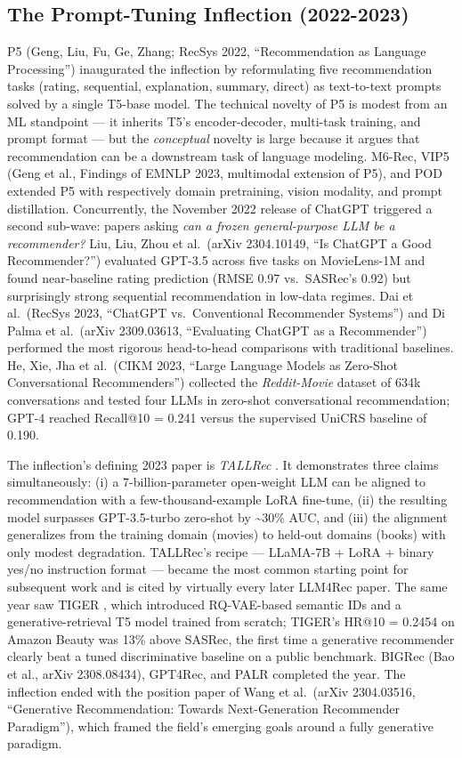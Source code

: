 \documentclass{article}
\begin{document}
\subsection{The Prompt-Tuning Inflection (2022-2023)}\label{the-prompt-tuning-inflection-2022-2023}

P5 (Geng, Liu, Fu, Ge, Zhang; RecSys 2022, ``Recommendation as Language Processing'') inaugurated the inflection by reformulating five recommendation tasks (rating, sequential, explanation, summary, direct) as text-to-text prompts solved by a single T5-base model. The technical novelty of P5 is modest from an ML standpoint --- it inherits T5's encoder-decoder, multi-task training, and prompt format --- but the \emph{conceptual} novelty is large because it argues that recommendation can be a downstream task of language modeling. M6-Rec, VIP5 (Geng et al., Findings of EMNLP 2023, multimodal extension of P5), and POD \citep{li2023textisallyouneedle} extended P5 with respectively domain pretraining, vision modality, and prompt distillation. Concurrently, the November 2022 release of ChatGPT triggered a second sub-wave: papers asking \emph{can a frozen general-purpose LLM be a recommender?} Liu, Liu, Zhou et al.~(arXiv 2304.10149, ``Is ChatGPT a Good Recommender?'') evaluated GPT-3.5 across five tasks on MovieLens-1M and found near-baseline rating prediction (RMSE 0.97 vs.~SASRec's 0.92) but surprisingly strong sequential recommendation in low-data regimes. Dai et al.~(RecSys 2023, ``ChatGPT vs.~Conventional Recommender Systems'') and Di Palma et al.~(arXiv 2309.03613, ``Evaluating ChatGPT as a Recommender'') performed the most rigorous head-to-head comparisons with traditional baselines. He, Xie, Jha et al.~(CIKM 2023, ``Large Language Models as Zero-Shot Conversational Recommenders'') collected the \emph{Reddit-Movie} dataset of 634k conversations and tested four LLMs in zero-shot conversational recommendation; GPT-4 reached Recall@10 = 0.241 versus the supervised UniCRS baseline of 0.190.

The inflection's defining 2023 paper is \emph{TALLRec} \citep{bao2023arxiv2305004472023}. It demonstrates three claims simultaneously: (i) a 7-billion-parameter open-weight LLM can be aligned to recommendation with a few-thousand-example LoRA fine-tune, (ii) the resulting model surpasses GPT-3.5-turbo zero-shot by \textasciitilde30\% AUC, and (iii) the alignment generalizes from the training domain (movies) to held-out domains (books) with only modest degradation. TALLRec's recipe --- LLaMA-7B + LoRA + binary yes/no instruction format --- became the most common starting point for subsequent work and is cited by virtually every later LLM4Rec paper. The same year saw TIGER \citep{rajput2023recommendersystems}, which introduced RQ-VAE-based semantic IDs and a generative-retrieval T5 model trained from scratch; TIGER's HR@10 = 0.2454 on Amazon Beauty was 13\% above SASRec, the first time a generative recommender clearly beat a tuned discriminative baseline on a public benchmark. BIGRec (Bao et al., arXiv 2308.08434), GPT4Rec, and PALR completed the year. The inflection ended with the position paper of Wang et al.~(arXiv 2304.03516, ``Generative Recommendation: Towards Next-Generation Recommender Paradigm''), which framed the field's emerging goals around a fully generative paradigm.
\end{document}
